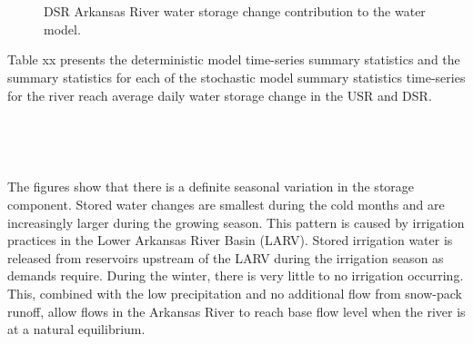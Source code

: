 \begin{linenumbers}
\begin{figure}[htbp]
	\centering
	\begin{subfigure}{0.5\textwidth}
		\centering
		\missingfigure{}
	\end{subfigure}\\%
	\begin{subfigure}{0.5\textwidth}
		\centering
		\missingfigure{}
	\end{subfigure}\\
	\caption[DSR Arkansas River water storage change contribution to the water model.]{DSR Arkansas River water storage change contribution to the water model.}
	\label{fig:DSRWaterStore}
\end{figure}

Table xx presents the deterministic model time-series summary statistics and the summary statistics for each of the stochastic model summary statistics time-series for the river reach average daily water storage change in the USR and DSR.
\\
\begin{table}[htbp]
	\centering
		\caption[River reach average daily stored water volume change.]{River reach average daily stored water volume change.  Values in hectare-meters (\si{\hectare\meter}) and values in parentheses in acre-feet (\si{\acre\foot})}
		\label{label}
	\begin{subtable}{\textwidth}
		\centering
		
	\end{subtable}\\
	\tablevspace
	\begin{subtable}{\textwidth}
		\centering
	\end{subtable}\\
\end{table}

The figures show that there is a definite seasonal variation in the storage component.  Stored water changes are smallest during the cold months and are increasingly larger during the growing season.  This pattern is caused by irrigation practices in the Lower Arkansas River Basin (LARV).  Stored irrigation water is released from reservoirs upstream of the LARV during the irrigation season as demands require.  During the winter, there is very little to no irrigation occurring.  This, combined with the low precipitation and no additional flow from snow-pack runoff, allow flows in the Arkansas River to reach base flow level when the river is at a natural equilibrium.


\end{linenumbers}
